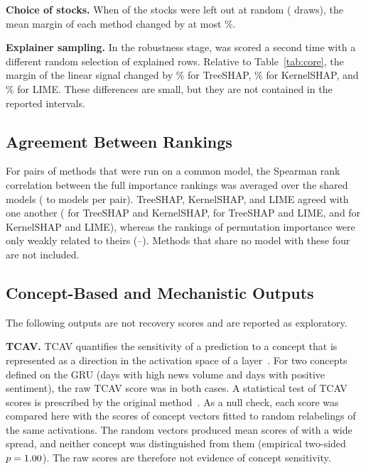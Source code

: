 \documentclass[conference]{IEEEtran}
\begin{document}
\textbf{Choice of stocks.} When \jackNDrop{} of the \faithUniverseN{} stocks
were left out at random (\jackNIter{} draws), the mean margin of each method
changed by at most \jackMarginDeltaMax\%.

\textbf{Explainer sampling.} In the robustness stage, \scoreYear{} was
scored a second time with a different random selection of explained rows.
Relative to Table~\ref{tab:core}, the margin of the linear signal changed by
\rerunDeltaTreeshap\% for TreeSHAP, \rerunDeltaKernelshap\% for KernelSHAP,
and \rerunDeltaLime\% for LIME. These differences are small, but they are
not contained in the reported intervals.

\subsection{Agreement Between Rankings}
For pairs of methods that were run on a common model, the Spearman rank
correlation between the full importance rankings was averaged over the
shared models (\agrCommonMin{} to \agrCommonMax{} models per pair). TreeSHAP,
KernelSHAP, and LIME agreed with one another (\agrKernelshapTreeshap{} for
TreeSHAP and KernelSHAP, \agrLimeTreeshap{} for TreeSHAP and LIME, and
\agrKernelshapLime{} for KernelSHAP and LIME), whereas the rankings of
permutation importance were only weakly related to theirs
(\agrPermMin--\agrPermMax). Methods that share no model with these four are
not included.

\subsection{Concept-Based and Mechanistic Outputs}
\label{sec:exploratory}
The following outputs are not recovery scores and are reported as
exploratory.

\textbf{TCAV.} TCAV quantifies the sensitivity of a prediction to a concept
that is represented as a direction in the activation space of a
layer~\cite{kim2018tcav}. For two concepts defined on the GRU (days with
high news volume and days with positive sentiment), the raw TCAV score was
\tcavScoreMax{} in both cases. A statistical test of TCAV scores is
prescribed by the original method~\cite{kim2018tcav}. As a null check, each
score was compared here with the scores of \tcavNRandom{} concept vectors
fitted to random relabelings of the same activations. The random vectors
produced mean scores of \tcavNullMeanRange{} with a wide spread, and neither
concept was distinguished from them (empirical two-sided $p=1.00$). The
raw scores are therefore not evidence of concept sensitivity.
\end{document}
